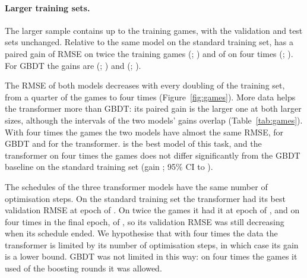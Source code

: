 \documentclass[11pt]{article}
\begin{document}
\ifmore
\paragraph{Larger training sets.}
The larger sample contains up to  the training games,
with the validation and test sets unchanged. Relative to the same model on
the standard training set,  has a paired gain of
 RMSE on
twice the training games
(;
) and of
 on
four times
(;
).
For GBDT the gains are 
(;
) and
(;
).

The RMSE of both models decreases with every doubling of the training set,
from a quarter of the games to four times (Figure~\ref{fig:games}). More data
helps the transformer more than GBDT: its paired gain is the larger one at
both larger sizes, although the intervals of the two models' gains overlap
(Table~\ref{tab:games}). With four times the games the two models have almost
the same RMSE,  for GBDT and
 for the transformer.
 is the best model of this task, and the transformer
on four times the games does not differ significantly from the GBDT baseline
on the standard training set (gain
; 95\% CI
 to
).

The schedules of the three transformer models have the same number of
optimisation steps. On
the standard training set the transformer had its best validation RMSE at
epoch  of
. On twice the games it had it at epoch
 of
, and on four times in the final
epoch,  of
, so its validation RMSE was
still decreasing when its schedule ended. We hypothesise that with four times
the data the transformer is limited by its number of optimisation steps, in
which case its gain is a lower bound. GBDT was not limited in this way: on
four times the games it used  of the
 boosting rounds it was allowed.
\end{document}
